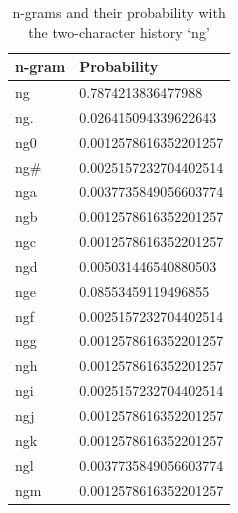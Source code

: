 \documentclass[12pt]{article}
\begin{document}
\begin{center}
	
	\begin{longtable}{ | m{10em} | m{10em} | } 
		\caption{n-grams and their probability with the two-character history `ng'}\\ 
		\hline
		n-gram & Probability  \\ 
		\hline
		ng   & 0.7874213836477988 \\ 
		\hline
		ng.   &   0.026415094339622643\\ 
		\hline
		
		\hline
		ng0  &   0.0012578616352201257\\
		\hline
		
		\hline
		ng\#   &  0.0025157232704402514\\
		\hline
		
		\hline
		nga   &  0.0037735849056603774\\
		\hline
		
		\hline
		ngb   &  0.0012578616352201257\\
		\hline
		
		\hline
		ngc   &  0.0012578616352201257\\
		\hline
		
		\hline
		ngd   &  0.005031446540880503\\
		\hline
		
		
		\hline
		nge   &  0.08553459119496855\\
		\hline
		
		\hline
		ngf    & 0.0025157232704402514\\
		\hline
		
		
		\hline
		ngg   &  0.0012578616352201257\\
		\hline
		
		
		\hline
		ngh   &  0.0012578616352201257\\
		\hline
		
		\hline
		ngi    & 0.0025157232704402514\\
		\hline
		
		\hline
		ngj    & 0.0012578616352201257\\
		\hline
		
		\hline
		ngk   &  0.0012578616352201257\\
		\hline
		
		\hline
		ngl    & 0.0037735849056603774\\
		\hline
		
		\hline
		ngm  &   0.0012578616352201257\\
		\hline
		

\end{longtable}
\end{center}
\end{document}
